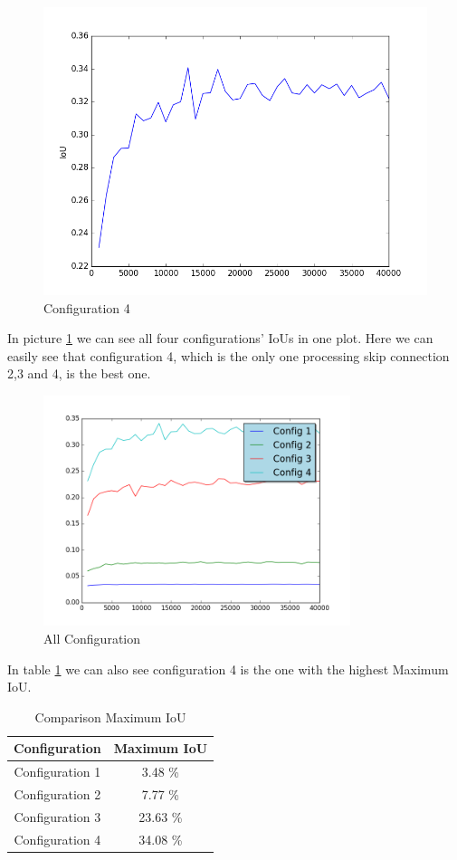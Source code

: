 \documentclass[
fontsize=12pt,
paper=a4,
parskip=false
]{article}
\begin{document}
\begin{figure}[ht]
	\begin{minipage}[b]{0.6\linewidth}
		\centering
		\includegraphics[width=.6\linewidth]{config_4} 
		\caption{Configuration 4} 
	\end{minipage} 
\end{figure}

In picture \ref{allConfigs} we can see all four configurations' IoUs in one plot. Here we can easily see that configuration 4, which is the only one processing skip connection 2,3 and 4, is the best one. 

\begin{figure}[ht]
\centering 
\includegraphics[width=0.8\textwidth]{allConfig}
\caption{All Configuration}
\label{allConfigs}
\end{figure}
\newpage
In table \ref{table} we can also see configuration 4 is the one with the highest Maximum IoU. 
\begin{table}[h!]
\centering
\begin{tabular}{|c|c|}
	\textbf{Configuration} & \textbf{Maximum IoU} \\
	\hline
	Configuration 1 & 3.48 \% \\
	Configuration 2 & 7.77 \% \\
	Configuration 3 & 23.63 \% \\
	Configuration 4 & 34.08 \% \\
\end{tabular}
\caption{Comparison Maximum IoU}
\label{table}
\end{table}
\end{document}
